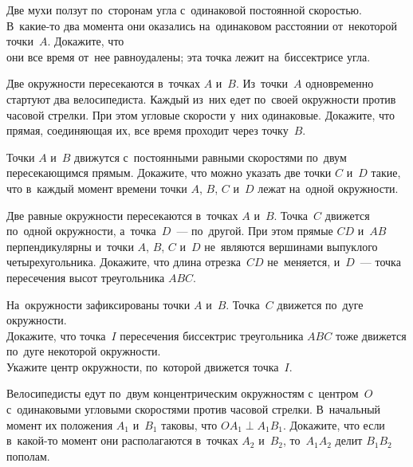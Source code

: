 


\begin{problems}

\item
Две мухи ползут по~сторонам угла с~одинаковой постоянной скоростью.
В~какие-то два момента они оказались на~одинаковом расстоянии от~некоторой
точки~$A$.
Докажите, что
\\
\subproblem они все время от~нее равноудалены;
\qquad
\subproblem эта точка лежит на~биссектрисе угла.

\item
Две окружности пересекаются в~точках $A$ и~$B$.
Из~точки~$A$ одновременно стартуют два велосипедиста.
Каждый из~них едет по~своей окружности против часовой стрелки.
При этом угловые скорости у~них одинаковые.
Докажите, что прямая, соединяющая их, все время проходит через точку~$B$.

\item
Точки $A$ и~$B$ движутся с~постоянными равными скоростями по~двум
пересекающимся прямым.
Докажите, что можно указать две точки $C$ и~$D$ такие, что в~каждый момент
времени точки $A$, $B$, $C$ и~$D$ лежат на~одной окружности.

\item
Две равные окружности пересекаются в~точках $A$ и~$B$.
Точка~$C$ движется по~одной окружности, а~точка~$D$~--- по~другой.
При этом прямые $CD$ и~$AB$ перпендикулярны и~точки $A$, $B$, $C$ и~$D$
не~являются вершинами выпуклого четырехугольника.
Докажите, что длина отрезка~$CD$ не~меняется, и~$D$~--- точка пересечения высот
треугольника $ABC$.

\item
На~окружности зафиксированы точки $A$ и~$B$.
Точка~$C$ движется по~дуге окружности.
\\
\subproblem
Докажите, что точка~$I$ пересечения биссектрис треугольника $ABC$ тоже движется
по~дуге некоторой окружности.
\\
\subproblem
Укажите центр окружности, по~которой движется точка~$I$.

\item
Велосипедисты едут по~двум концентрическим окружностям с~центром~$O$
с~одинаковыми угловыми скоростями против часовой стрелки.
В~начальный момент их положения $A_1$  и~$B_1$ таковы, что
$O A_1 \perp A_1 B_1$.
Докажите, что если в~какой-то момент они располагаются в~точках $A_2$ и~$B_2$,
то~$A_1 A_2$ делит $B_1 B_2$ пополам.


\end{problems}
